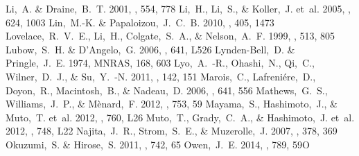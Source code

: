\documentclass[apj]{emulateapj-rtx4}
\begin{document}
\begin{thebibliography}{}
   Li,~A. \& Draine,~B.~T. 2001, \apj, 554, 778 
   Li,~H., Li,~S., \& Koller,~J. et~al. 2005, \apj, 624, 1003 
   Lin,~M.-K. \& Papaloizou,~J.~C.~B. 2010, \mnras, 405, 1473 
   Lovelace,~R.~V.~E., Li,~H., Colgate,~S.~A., \& Nelson,~A.~F. 1999, \apj, 513, 805 
   Lubow,~S.~H. \& D'Angelo,~G. 2006, \apj, 641, L526 
   Lynden-Bell,~D. \& Pringle,~J.~E. 1974, MNRAS, 168, 603 
   Lyo,~A.~-R., Ohashi,~N., Qi,~C., Wilner,~D.~J., \& Su,~Y.~-N. 2011, \aj, 142, 151 
   Marois,~C., Lafreni\'{e}re,~D., Doyon,~R., Macintosh,~B., \& Nadeau,~D. 2006, \apj, 641, 556
   Mathews,~G.~S., Williams,~J.~P., \& M\`{e}nard,~F. 2012, \apj, 753, 59 
   Mayama,~S., Hashimoto,~J., \& Muto,~T. et~al. 2012, \apjl, 760, L26 
   Muto,~T., Grady,~C.~A., \& Hashimoto,~J. et~al. 2012, \apj, 748, L22 
   Najita,~J.~R., Strom,~S.~E., \& Muzerolle,~J. 2007, \mnras, 378, 369 
   Okuzumi,~S. \& Hirose,~S. 2011, \apj, 742, 65 
   Owen,~J.~E. 2014, \apj, 789, 59O

\end{thebibliography}
\end{document}
